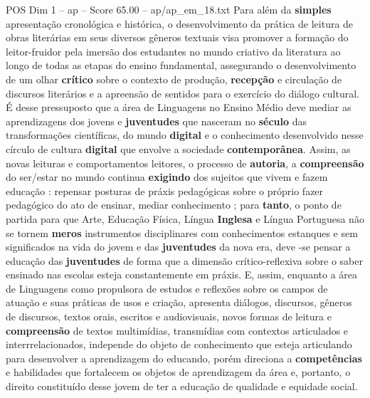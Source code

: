 \begin{textsample}{POS Dim 1 – ap – Score 65.00 – ap/ap\_em\_18.txt}
Para além da \textbf{simples} apresentação cronológica e histórica, o desenvolvimento da prática de leitura de obras literárias em seus diversos gêneros textuais visa promover a formação do leitor-fruidor pela imersão dos estudantes no mundo criativo da literatura ao longo de todas as etapas do ensino fundamental, assegurando o desenvolvimento de um olhar \textbf{crítico} sobre o contexto de produção, \textbf{recepção} e circulação de discursos literários e a apreensão de sentidos para o exercício do diálogo cultural.
É desse pressuposto que a área de Linguagens no Ensino Médio deve mediar as aprendizagens dos jovens e \textbf{juventudes} que nasceram no \textbf{século} das transformações científicas, do mundo \textbf{digital} e o conhecimento desenvolvido nesse círculo de cultura \textbf{digital} que envolve a sociedade \textbf{contemporânea}.
Assim, as novas leituras e comportamentos leitores, o processo de \textbf{autoria}, a \textbf{compreensão} do ser/estar no mundo continua \textbf{exigindo} dos sujeitos que vivem e fazem educação : repensar posturas de práxis pedagógicas sobre o próprio fazer pedagógico do ato de ensinar, mediar conhecimento ; para \textbf{tanto}, o ponto de partida para que Arte, Educação Física, Língua \textbf{Inglesa} e Língua Portuguesa não se tornem \textbf{meros} instrumentos disciplinares com conhecimentos estanques e sem significados na vida do jovem e das \textbf{juventudes} da nova era, deve -se pensar a educação das \textbf{juventudes} de forma que a dimensão crítico-reflexiva sobre o saber ensinado nas escolas esteja constantemente em práxis.
E, assim, enquanto a área de Linguagens como propulsora de estudos e reflexões sobre os campos de atuação e suas práticas de usos e criação, apresenta diálogos, discursos, gêneros de discursos, textos orais, escritos e audiovisuais, novos formas de leitura e \textbf{compreensão} de textos multimídias, transmídias com contextos articulados e interrrelacionados, independe do objeto de conhecimento que esteja articulando para desenvolver a aprendizagem do educando, porém direciona a \textbf{competências} e habilidades que fortalecem os objetos de aprendizagem da área e, portanto, o direito constituído desse jovem de ter a educação de qualidade e equidade social.

\end{textsample}
